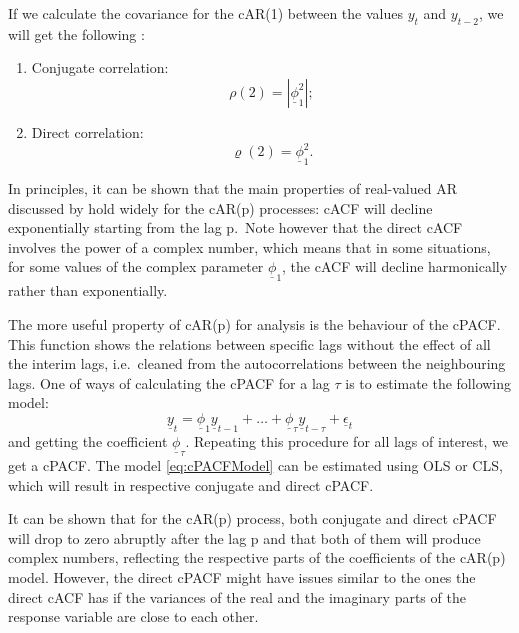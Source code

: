 \documentclass[
]{book}
\begin{document}
If we calculate the covariance for the cAR(1) between the values \(y_{t}\) and \(y_{t-2}\), we will get the following \citep[the reader is encouraged to do the calculations manually to check the correctness of the final result, but also see][]{Knight2019}:

\begin{enumerate}
\def\labelenumi{\arabic{enumi}.}
\item
  Conjugate correlation:
  \begin{equation}
   \rho(2) = | \underline{\phi}_1^2 |;
   \label{eq:ComplexAR1ConjCorShort}
  \end{equation}
\item
  Direct correlation:
  \begin{equation}
   \varrho(2) =  \underline{\phi}_1^2.
   \label{eq:ComplexAR1DirCorShort}
  \end{equation}
\end{enumerate}

In principles, it can be shown that the main properties of real-valued AR discussed by \citet{Box1976} hold widely for the cAR(p) processes: cACF will decline exponentially starting from the lag p.~Note however that the direct cACF involves the power of a complex number, which means that in some situations, for some values of the complex parameter \(\underline{\phi}_1\), the cACF will decline harmonically rather than exponentially.

The more useful property of cAR(p) for analysis is the behaviour of the cPACF. This function shows the relations between specific lags without the effect of all the interim lags, i.e.~cleaned from the autocorrelations between the neighbouring lags. One of ways of calculating the cPACF for a lag \(\tau\) is to estimate the following model:
\begin{equation}
    \underline{y}_t = \underline{\phi}_1 \underline{y}_{t-1} + \dots + \underline{\phi}_\tau \underline{y}_{t-\tau} + \underline{\epsilon}_t
    \label{eq:cPACFModel}
\end{equation}
and getting the coefficient \(\underline{\phi}_\tau\). Repeating this procedure for all lags of interest, we get a cPACF. The model \eqref{eq:cPACFModel} can be estimated using OLS or CLS, which will result in respective conjugate and direct cPACF.

It can be shown that for the cAR(p) process, both conjugate and direct cPACF will drop to zero abruptly after the lag p and that both of them will produce complex numbers, reflecting the respective parts of the coefficients of the cAR(p) model. However, the direct cPACF might have issues similar to the ones the direct cACF has if the variances of the real and the imaginary parts of the response variable are close to each other.
\end{document}
